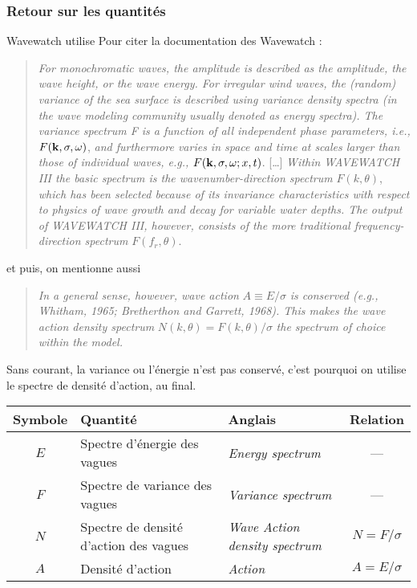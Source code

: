 \documentclass[10pt]{article}
\numberwithin{equation}{section}
\begin{document}
\subsubsection{Retour sur les quantités}
\label{sec:org1a303b5}
Wavewatch utilise Pour citer la documentation des Wavewatch \autocite{wwiii2016user} :\medskip
\begin{quote}
\emph{For monochromatic waves, the amplitude is described as the amplitude, the wave height, or the wave energy. For irregular wind waves, the (random) variance of the sea surface is described using variance density spectra (in the wave modeling community usually denoted as energy spectra). The variance spectrum F is a function of all independent phase parameters, i.e.,} \(F(\vb{k},\sigma,\omega)\), \emph{and furthermore varies in space and time at scales larger than those of individual waves, e.g.,} \(F(\vb{k},\sigma,\omega; x, t)\). [\ldots{}]
\emph{Within WAVEWATCH III the basic spectrum is the wavenumber-direction spectrum} \(F(k,\theta)\), \emph{which has been selected because of its invariance characteristics with respect to physics of wave growth and decay for variable water depths. The output of WAVEWATCH III, however, consists of the more traditional frequency-direction spectrum} \(F(f_r,\theta)\).
\end{quote}
\medskip

et puis, on mentionne aussi \medskip
\begin{quote}
\emph{In a general sense, however, wave action} \(A\equiv E/\sigma\) \emph{is conserved (e.g., Whitham, 1965; Bretherthon and Garrett, 1968). This makes the wave action density spectrum} \(N(k,\theta) = F(k,\theta)/\sigma\) \emph{the spectrum of choice within the model.}
\end{quote}
\medskip

Sans courant, la variance ou l'énergie n'est pas conservé, c'est pourquoi on utilise le spectre de densité d'action, au final.


\begin{center}
\begin{tabular}{cllc}
\hline
Symbole & Quantité & Anglais & Relation\\
\hline
\(E\) & Spectre d'énergie des vagues & \emph{Energy spectrum} & ---\\
\(F\) & Spectre de variance des vagues & \emph{Variance spectrum} & ---\\
\(N\) & Spectre de densité d'action des vagues & \emph{Wave Action density spectrum} & \(N = F/\sigma\)\\
\(A\) & Densité d'action & \emph{Action} & \(A = E/\sigma\)\\
\hline
\end{tabular}
\end{center}
\end{document}

